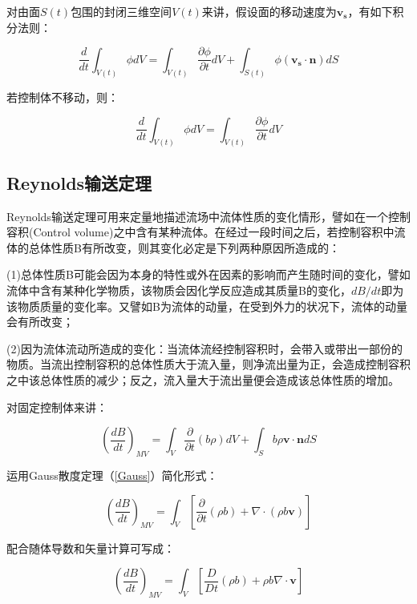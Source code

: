 对由面$ S(t) $包围的封闭三维空间$ V(t) $来讲，假设面的移动速度为$ \mathbf{v_s} $，有如下积分法则：

\begin{equation}
    \frac{d}{dt} \int_{V(t)} \phi dV = \int_{V(t)} \frac{\partial \phi}{\partial t} dV + \int_{S(t)} \phi(\mathbf{v_s}\cdot \mathbf{n}) dS
\end{equation}

若控制体不移动，则：

\begin{equation}\label{Leibniz}
\frac{d}{dt} \int_{V(t)} \phi dV = \int_{V(t)} \frac{\partial \phi}{\partial t} dV
\end{equation}

\subsection{Reynolds输送定理}
Reynolds输送定理可用来定量地描述流场中流体性质的变化情形，譬如在一个控制容积(Control volume)之中含有某种流体。在经过一段时间之后，若控制容积中流体的总体性质B有所改变，则其变化必定是下列两种原因所造成的：

(1)总体性质B可能会因为本身的特性或外在因素的影响而产生随时间的变化，譬如流体中含有某种化学物质，该物质会因化学反应造成其质量B的变化，$ dB/dt $即为该物质质量的变化率。又譬如B为流体的动量，在受到外力的状况下，流体的动量会有所改变；

(2)因为流体流动所造成的变化：当流体流经控制容积时，会带入或带出一部份的物质。当流出控制容积的总体性质大于流入量，则净流出量为正，会造成控制容积之中该总体性质的减少；反之，流入量大于流出量便会造成该总体性质的增加。


对固定控制体来讲：

\begin{equation}
    \left( \frac{dB}{dt} \right)_{MV} = \int_V \frac{\partial}{\partial t}(b\rho)dV + \int_S b\rho\mathbf{v\cdot n} dS
\end{equation}

运用Gauss散度定理（\autoref{Gauss}）简化形式：

\begin{equation}
    \left( \frac{dB}{dt} \right)_{MV} = \int_V \left[ \frac{\partial}{\partial t}(\rho b) + \nabla\cdot(\rho b\mathbf{v}) \right]
\end{equation}

配合随体导数和矢量计算可写成：

\begin{equation}
\left( \frac{dB}{dt} \right)_{MV} = \int_V \left[ \frac{D}{Dt}(\rho b) + \rho b \nabla\cdot\mathbf{v} \right]
\end{equation}

